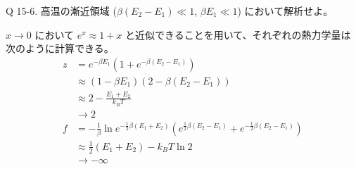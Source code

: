 \documentclass[uplatex,dvipdfmx,a4paper,11pt]{jlreq}
\theoremstyle{definition}
\begin{document}
\begin{itembox}[l]{Q 15-6.}
  高温の漸近領域 ($\beta(E_2 - E_1) \ll 1$, $\beta E_1 \ll 1$) において解析せよ。
\end{itembox}
$x \to 0$ において $e^x \approx 1 + x$ と近似できることを用いて、それぞれの熱力学量は次のように計算できる。
\begin{align}
  z & = e^{-\beta E_1}(1 + e^{-\beta (E_2 - E_1)})                                                                                                                                                                                                                                                 \\
    & \approx (1 - \beta E_1)(2 -\beta (E_2 - E_1))                                                                                                                                                                                                                                                \\
    & \approx 2 - \frac{E_1 + E_2}{k_BT}                                                                                                                                                                                                                                                           \\
    & \to 2                                                                                                                                                                                                                                                                                        \\
  f & = -\frac{1}{\beta}\ln e^{-\frac{1}{2}\beta (E_1 + E_2)}(e^{\frac{1}{2}\beta (E_2 - E_1)} + e^{-\frac{1}{2}\beta (E_2 - E_1)})                                                                                                                                                                \\
    & \approx \frac{1}{2}(E_1 + E_2) - k_BT\ln 2                                                                                                                                                                                                                                                   \\
    & \to -\infty                                                                                                                                                                                                                                                                                  \\

\end{align}
\end{document}
